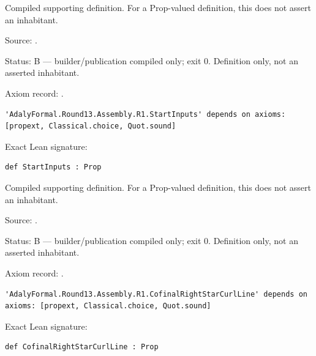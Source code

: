 \begin{definition}[bp-558]
\label{bp-558}
\uses{}
\leanok
Compiled supporting definition. For a Prop-valued definition, this does not assert an inhabitant.

\par Source: \texttt{}.
\par Status: B — builder/publication compiled only; exit 0. Definition only, not an asserted inhabitant.
\par Axiom record: \texttt{}.
\begin{verbatim}
'AdalyFormal.Round13.Assembly.R1.StartInputs' depends on axioms: [propext, Classical.choice, Quot.sound]
\end{verbatim}
\par Exact Lean signature:
\begin{verbatim}
def StartInputs : Prop
\end{verbatim}
\end{definition}

\begin{definition}[bp-559]
\label{bp-559}
\uses{}
\leanok
Compiled supporting definition. For a Prop-valued definition, this does not assert an inhabitant.

\par Source: \texttt{}.
\par Status: B — builder/publication compiled only; exit 0. Definition only, not an asserted inhabitant.
\par Axiom record: \texttt{}.
\begin{verbatim}
'AdalyFormal.Round13.Assembly.R1.CofinalRightStarCurlLine' depends on axioms: [propext, Classical.choice, Quot.sound]
\end{verbatim}
\par Exact Lean signature:
\begin{verbatim}
def CofinalRightStarCurlLine : Prop
\end{verbatim}
\end{definition}

